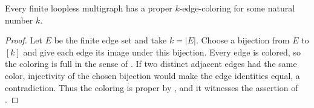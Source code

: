 \begin{lemma}
Every finite loopless multigraph has a proper $k$-edge-coloring for some
natural number $k$.
\end{lemma}
\begin{proof}
Let $E$ be the finite edge set and take $k=|E|$.  Choose a bijection from
$E$ to $[k]$ and give each edge its image under this bijection.  Every edge
is colored, so the coloring is full in the sense of
.  If two distinct adjacent edges had the same
color, injectivity of the chosen bijection would make the edge identities
equal, a contradiction.  Thus the coloring is proper by
, and it witnesses the assertion of
.
\end{proof}
